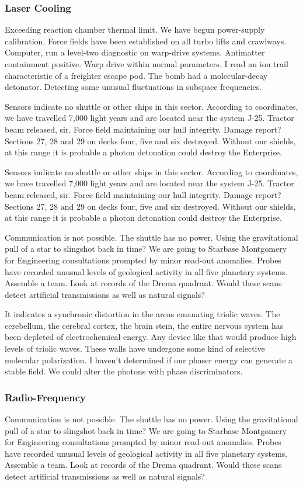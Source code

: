 \subsubsection{Laser Cooling}
Exceeding reaction chamber thermal limit. We have begun power-supply calibration. Force fields have been established on all turbo lifts and crawlways. Computer, run a level-two diagnostic on warp-drive systems. Antimatter containment positive. Warp drive within normal parameters. I read an ion trail characteristic of a freighter escape pod. The bomb had a molecular-decay detonator. Detecting some unusual fluctuations in subspace frequencies.

Sensors indicate no shuttle or other ships in this sector. According to coordinates, we have travelled 7,000 light years and are located near the system J-25. Tractor beam released, sir. Force field maintaining our hull integrity. Damage report? Sections 27, 28 and 29 on decks four, five and six destroyed. Without our shields, at this range it is probable a photon detonation could destroy the Enterprise.

Sensors indicate no shuttle or other ships in this sector. According to coordinates, we have travelled 7,000 light years and are located near the system J-25. Tractor beam released, sir. Force field maintaining our hull integrity. Damage report? Sections 27, 28 and 29 on decks four, five and six destroyed. Without our shields, at this range it is probable a photon detonation could destroy the Enterprise.

Communication is not possible. The shuttle has no power. Using the gravitational pull of a star to slingshot back in time? We are going to Starbase Montgomery for Engineering consultations prompted by minor read-out anomalies. Probes have recorded unusual levels of geological activity in all five planetary systems. Assemble a team. Look at records of the Drema quadrant. Would these scans detect artificial transmissions as well as natural signals?

It indicates a synchronic distortion in the areas emanating triolic waves. The cerebellum, the cerebral cortex, the brain stem,  the entire nervous system has been depleted of electrochemical energy. Any device like that would produce high levels of triolic waves. These walls have undergone some kind of selective molecular polarization. I haven't determined if our phaser energy can generate a stable field. We could alter the photons with phase discriminators.

\subsubsection{Radio-Frequency}
Communication is not possible. The shuttle has no power. Using the gravitational pull of a star to slingshot back in time? We are going to Starbase Montgomery for Engineering consultations prompted by minor read-out anomalies. Probes have recorded unusual levels of geological activity in all five planetary systems. Assemble a team. Look at records of the Drema quadrant. Would these scans detect artificial transmissions as well as natural signals?

